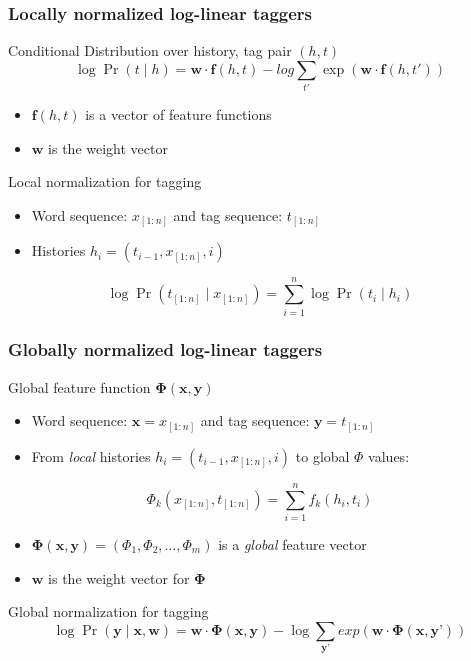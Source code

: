 \begin{frame}
\frametitle{Locally normalized log-linear taggers}
\begin{block}{Conditional Distribution over history, tag pair $(h,t)$}
\[ \log \Pr(t \mid h) = \textbf{w} \cdot \textbf{f}(h, t) - log \sum_{t'} \exp \left( \textbf{w} \cdot \textbf{f}(h, t') \right) \]
\begin{itemize}
\item $\textbf{f}(h, t)$ is a vector of feature functions
\item $\textbf{w}$ is the weight vector
\end{itemize}
\end{block}
\pause
\begin{block}{Local normalization for tagging}
\begin{itemize}
\item Word sequence: $x_{[1:n]}$ and tag sequence: $t_{[1:n]}$
\item Histories $h_i = (t_{i-1}, x_{[1:n]}, i)$ 
\end{itemize}
\[ \log \Pr( t_{[1:n]} \mid x_{[1:n]} ) = \sum_{i=1}^n \log \Pr(t_i \mid h_i) \]
\end{block}
\end{frame}


\begin{frame}
\frametitle{Globally normalized log-linear taggers}
\begin{block}{Global feature function $\mathbf{\Phi}(\textbf{x}, \textbf{y})$}
\begin{itemize}
\item Word sequence: $\textbf{x} = x_{[1:n]}$ and tag sequence: $\textbf{y} = t_{[1:n]}$
\item From \textit{local} histories $h_i = (t_{i-1}, x_{[1:n]}, i)$ to global $\Phi$ values:
\end{itemize}
\[ \Phi_k(x_{[1:n]}, t_{[1:n]}) = \sum_{i=1}^n f_k(h_i, t_i) \]
\begin{itemize}
\item $\mathbf{\Phi}(\textbf{x}, \textbf{y}) = (\Phi_1, \Phi_2, \ldots, \Phi_m)$ is a \textit{global} feature vector
\item $\textbf{w}$ is the weight vector for $\mathbf{\Phi}$
\end{itemize}
\end{block}
\pause
\begin{block}{Global normalization for tagging}
\[ \log \Pr(\textbf{y} \mid \textbf{x}, \textbf{w}) = \textbf{w} \cdot \mathbf{\Phi}(\textbf{x}, \textbf{y}) - \log \sum_{\textbf{y'}} exp\left( \textbf{w} \cdot \mathbf{\Phi}(\textbf{x}, \textbf{y'}) \right) \]
\end{block}
\end{frame}

